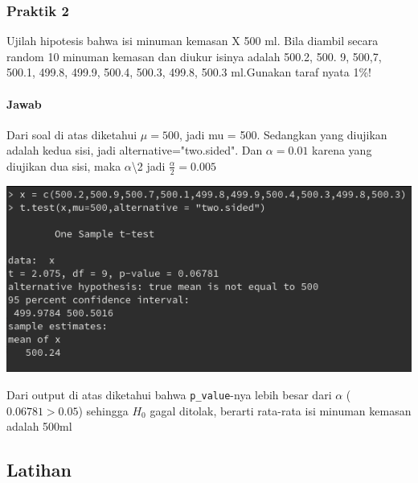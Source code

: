 \documentclass[a4paper,12pt]{article}
\begin{document}
\subsubsection{Praktik 2}
Ujilah hipotesis bahwa isi minuman kemasan X 500 ml. Bila diambil secara random 10 minuman kemasan dan diukur isinya adalah 500.2, 500. 9, 500,7,  500.1,  499.8,  499.9, 500.4,  500.3, 499.8, 500.3 ml.Gunakan taraf nyata 1\%! 

\paragraph{Jawab\\}
Dari soal di atas diketahui $\mu = 500$, jadi mu = 500. Sedangkan yang diujikan adalah kedua sisi, jadi alternative="two.sided". Dan $\alpha = 0.01$ karena yang diujikan dua sisi, maka $\alpha$\textbackslash2 jadi $\frac{\alpha}{2} = 0.005$
\begin{center}
    \includegraphics[width = 0.8\linewidth]{prak2.png}
\end{center}
Dari output di atas diketahui bahwa \texttt{p\_value}-nya lebih besar dari $\alpha$ ($0.06781 > 0.05$) sehingga $H_{0}$ gagal ditolak, berarti rata-rata isi minuman kemasan adalah 500ml

\newpage

\subsection{Latihan}
\end{document}
